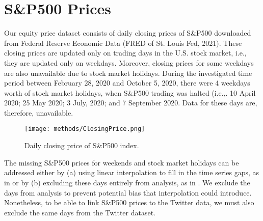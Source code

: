 \section{S\&P500 Prices}
Our equity price dataset consists of daily closing prices of S\&P500 downloaded from Federal Reserve Economic Data (FRED of St. Louis Fed, 2021). These closing prices are updated only on trading days in the U.S. stock market, i.e., they are updated only on weekdays. Moreover, closing prices for some weekdays are also unavailable due to stock market holidays. During the investigated time period between February 28, 2020 and October 5, 2020, there were 4 weekdays worth of stock market holidays, when S\&P500 trading was halted (i.e.,. 10 April 2020; 25 May 2020; 3 July, 2020; and 7 September 2020. Data for these days are, therefore, unavailable. 

\begin{figure}[htp]
    \centering
    \texttt{[image: methods/ClosingPrice.png]}
    \caption{Daily closing price of S\&P500 index.}
    \label{fig:ClosingPrice}
\end{figure}

The missing S&P500 prices for weekends and stock market holidays can be addressed either by (a) using linear interpolation to fill in the time series gaps, as in \textcite{davis2021stock} or by (b) excluding these days entirely from analysis, as in \textcite{bollen2011twitter}. We exclude the days from analysis to prevent potential bias that interpolation could introduce. Nonetheless, to be able to link S&P500 prices to the Twitter data, we must also exclude the same days from the Twitter dataset.
